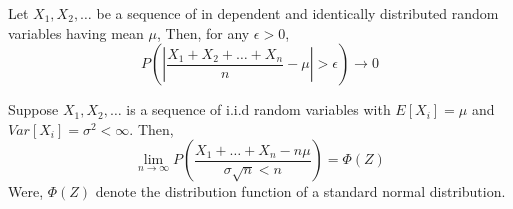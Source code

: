 \begin{theorem}
    Let $X_1,X_2,\ldots$ be a sequence of in dependent and identically distributed 
    random variables having mean $ \mu $, Then, for any $ \epsilon >0 $,
    \[
        P \left( \left|\frac{X_1+X_2+ \ldots + X_n }{n} - \mu \right| > \epsilon \right) \to 0 
    \]
\end{theorem}

\begin{theorem}
    Suppose $X_1, X_2, \ldots  $ is a sequence of i.i.d random variables with 
    $E[X_i]=\mu$ and $Var[X_i]=\sigma ^{2} < \infty$. Then, 
    \[
        \lim_{n \to \infty} P\left( \frac{X_1+\ldots+X_n - n\mu}{\sigma \sqrt{n } < n } \right) = \Phi(Z)
    \]
    Were, $\Phi(Z)$ denote the distribution function of a standard normal distribution.
\end{theorem}


